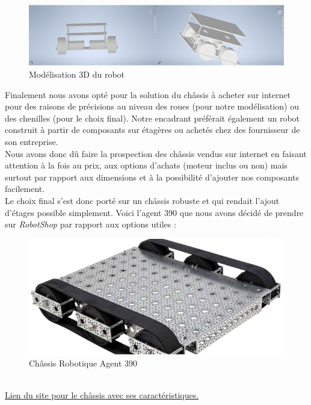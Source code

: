 \documentclass[french]{rapportENSTAB}
\begin{document}
\begin{figure}[H]
    \centering
    \includegraphics[scale=0.70]{images/robot/chassis 3D.png}
    \caption{Modélisation 3D du robot}
    \label{fig:cdcf}
\end{figure}

Finalement nous avons opté pour la solution du châssis à acheter sur internet pour des raisons de précisions au niveau des roues (pour notre modélisation) ou des chenilles (pour le choix final). Notre encadrant préférait également un robot construit à partir de composants sur étagères ou achetés chez des fournisseur de son entreprise.  \\

Nous avons donc dû faire la prospection des châssis vendus sur internet en faisant attention à la fois au prix, aux options d’achats (moteur inclus ou non) mais surtout par rapport aux dimensions et à la possibilité d’ajouter nos composants facilement.\\ 

Le choix final s’est donc porté sur un châssis robuste et qui rendait l'ajout d'étages possible simplement. Voici l’agent 390 que nous avons décidé de prendre sur \textit{RobotShop} par rapport aux options utiles : 

\begin{figure}[H]
    \centering
    \includegraphics[scale=0.70]{images/robot/chassis.png}
    \caption{Châssis Robotique Agent 390}
    \label{fig:cdcf}
\end{figure}\\
\href{https://www.robotshop.com/eu/fr/kit-robot-chenilles-agent-390-avec-moteurs.html}{Lien du site pour le châssis avec ses  caractéristiques.}\\
\end{document}
